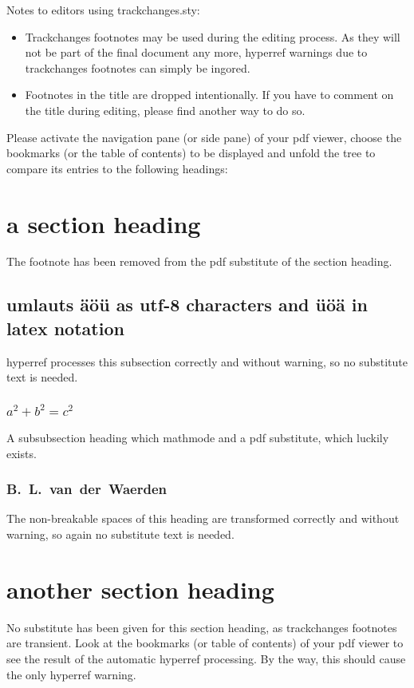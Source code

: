 \documentclass{snapshotmfo}
\begin{document}
\noindent Notes to editors using trackchanges.sty:
\begin{itemize}
  \item Trackchanges footnotes may be used during the editing process. As they will not be part of the final document any more, hyperref warnings due to trackchanges footnotes can simply be ingored.
  \item Footnotes in the title are dropped intentionally. If you have to comment on the title during editing, please find another way to do so.
\end{itemize}

\noindent Please activate the navigation pane (or side pane) of your pdf viewer, choose the bookmarks (or the table of contents) to be displayed and unfold the tree to compare its entries to the following headings:

\section[abbr. section heading]{a section heading
}
The footnote has been removed from the pdf substitute of the section heading.

\subsection{umlauts äöü as utf-8 characters and \"u\"o\"a in latex notation}
hyperref processes this subsection correctly and without warning, so no substitute text is needed.

\subsubsection[a²+b²=c²]{$a^2 + b^2 = c^2$}
A subsubsection heading which mathmode and a pdf substitute, which luckily exists.

\subsubsection{B.~L.~van~der~Waerden}
The non-breakable spaces of this heading are transformed correctly and without warning, so again no substitute text is needed.

\section{another section heading}
No substitute has been given for this section heading, as trackchanges footnotes are transient.
Look at the bookmarks (or table of contents) of your pdf viewer to see the result of the automatic hyperref processing.
By the way, this should cause the only hyperref warning.
\end{document}
